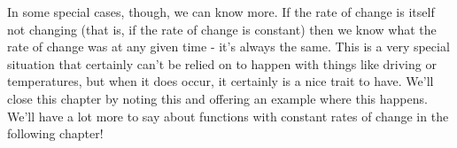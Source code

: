 In some special cases, though, we can know more. If the rate of change is itself not changing (that is, if the rate of change is constant) then we know what the rate of change was at any given time - it’s always the same. This is a very special situation that certainly can’t be relied on to happen with things like driving or temperatures, but when it does occur, it certainly is a nice trait to have. We’ll close this chapter by noting this and offering an example where this happens. We’ll have a lot more to say about functions with constant rates of change in the following chapter!


